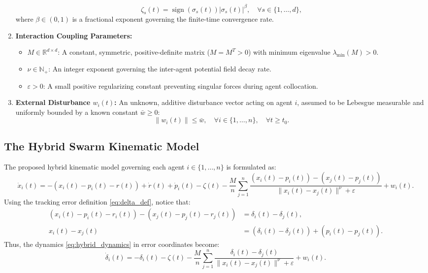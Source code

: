 \documentclass[11pt]{article}
\begin{document}
\begin{enumerate}
    \begin{equation}
    \zeta_s(t) = \operatorname{sign}(\sigma_s(t)) |\sigma_s(t)|^\beta, \quad \forall s \in \{1, \dots, d\},
    \end{equation}
    where $\beta \in (0, 1)$ is a fractional exponent governing the finite-time convergence rate.
    \item \textbf{Interaction Coupling Parameters:}
    \begin{itemize}
        \item $M \in \mathbb{R}^{d \times d}$: A constant, symmetric, positive-definite matrix ($M = M^T > 0$) with minimum eigenvalue $\lambda_{\min}(M) > 0$.
        \item $\nu \in \mathbb{N}_+$: An integer exponent governing the inter-agent potential field decay rate.
        \item $\varepsilon > 0$: A small positive regularizing constant preventing singular forces during agent collocation.
    \end{itemize}
    \item \textbf{External Disturbance $w_i(t)$:} An unknown, additive disturbance vector acting on agent $i$, assumed to be Lebesgue measurable and uniformly bounded by a known constant $\bar{w} \ge 0$:
    \begin{equation}
    \|w_i(t)\| \le \bar{w}, \quad \forall i \in \{1, \dots, n\}, \quad \forall t \ge t_0.
    \end{equation}
\end{enumerate}

\subsection{The Hybrid Swarm Kinematic Model}
The proposed hybrid kinematic model governing each agent $i \in \{1, \dots, n\}$ is formulated as:
\begin{equation}
\dot{x}_i(t) = -(x_i(t) - p_i(t) - r(t)) + \dot{r}(t) + \dot{p}_i(t) - \zeta(t) - \frac{M}{n}\sum_{j=1}^{n} \frac{(x_i(t) - p_i(t)) - (x_j(t) - p_j(t))}{\|x_i(t) - x_j(t)\|^\nu + \varepsilon} + w_i(t).
\label{eq:hybrid_dynamics}
\end{equation}
Using the tracking error definition \eqref{eq:delta_def}, notice that:
\begin{align}
(x_i(t) - p_i(t) - r_i(t)) - (x_j(t) - p_j(t) - r_j(t)) &= \delta_i(t) - \delta_j(t), \\
x_i(t) - x_j(t) &= (\delta_i(t) - \delta_j(t)) + (p_i(t) - p_j(t)).
\end{align}
Thus, the dynamics \eqref{eq:hybrid_dynamics} in error coordinates become:
\begin{equation}
\dot{\delta}_i(t) = -\delta_i(t) - \zeta(t) - \frac{M}{n}\sum_{j=1}^{n} \frac{\delta_i(t) - \delta_j(t)}{\|x_i(t) - x_j(t)\|^\nu + \varepsilon} + w_i(t).
\label{eq:error_dynamics}
\end{equation}
\end{document}

